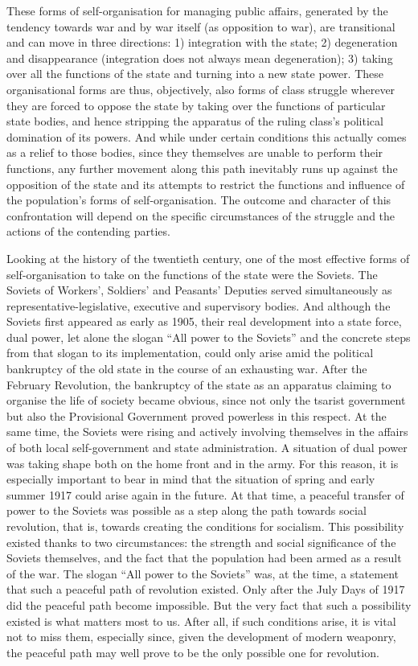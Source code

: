 \documentclass[12pt,a4paper,openany]{book}
\begin{document}
These forms of self-organisation for managing public affairs, generated by the tendency towards war and by war itself (as opposition to war), are transitional and can move in three directions: 1) integration with the state; 2) degeneration and disappearance (integration does not always mean degeneration); 3) taking over all the functions of the state and turning into a new state power. These organisational forms are thus, objectively, also forms of class struggle wherever they are forced to oppose the state by taking over the functions of particular state bodies, and hence stripping the apparatus of the ruling class’s political domination of its powers. And while under certain conditions this actually comes as a relief to those bodies, since they themselves are unable to perform their functions, any further movement along this path inevitably runs up against the opposition of the state and its attempts to restrict the functions and influence of the population’s forms of self-organisation. The outcome and character of this confrontation will depend on the specific circumstances of the struggle and the actions of the contending parties.

Looking at the history of the twentieth century, one of the most effective forms of self-organisation to take on the functions of the state were the Soviets. The Soviets of Workers’, Soldiers’ and Peasants’ Deputies served simultaneously as representative-legislative, executive and supervisory bodies. And although the Soviets first appeared as early as 1905, their real development into a state force, dual power, let alone the slogan “All power to the Soviets” and the concrete steps from that slogan to its implementation, could only arise amid the political bankruptcy of the old state in the course of an exhausting war. After the February Revolution, the bankruptcy of the state as an apparatus claiming to organise the life of society became obvious, since not only the tsarist government but also the Provisional Government proved powerless in this respect. At the same time, the Soviets were rising and actively involving themselves in the affairs of both local self-government and state administration. A situation of dual power was taking shape both on the home front and in the army. For this reason, it is especially important to bear in mind that the situation of spring and early summer 1917 could arise again in the future. At that time, a peaceful transfer of power to the Soviets was possible as a step along the path towards social revolution, that is, towards creating the conditions for socialism. This possibility existed thanks to two circumstances: the strength and social significance of the Soviets themselves, and the fact that the population had been armed as a result of the war. The slogan “All power to the Soviets” was, at the time, a statement that such a peaceful path of revolution existed. Only after the July Days of 1917 did the peaceful path become impossible. But the very fact that such a possibility existed is what matters most to us. After all, if such conditions arise, it is vital not to miss them, especially since, given the development of modern weaponry, the peaceful path may well prove to be the only possible one for revolution.
\end{document}
